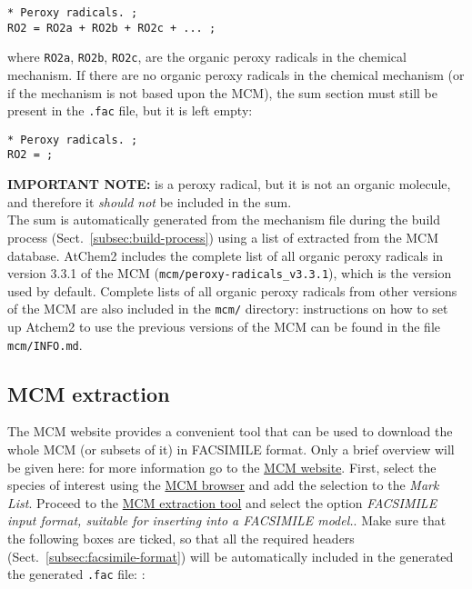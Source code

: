 \begin{verbatim}
* Peroxy radicals. ;
RO2 = RO2a + RO2b + RO2c + ... ;
\end{verbatim}

where \texttt{RO2a}, \texttt{RO2b}, \texttt{RO2c}, are the organic
peroxy radicals in the chemical mechanism. If there are no organic
peroxy radicals in the chemical mechanism (or if the mechanism is not
based upon the MCM), the  sum section must still be present in
the \texttt{.fac} file, but it is left empty:

\begin{verbatim}
* Peroxy radicals. ;
RO2 = ;
\end{verbatim}

\textbf{IMPORTANT NOTE:}  is a peroxy radical, but it is not an
organic molecule, and therefore it \emph{should not} be included in
the  sum.\\

The  sum is automatically generated from the mechanism file
during the build process (Sect.~\ref{subsec:build-process}) using a
list of  extracted from the MCM database. AtChem2 includes the
complete list of all organic peroxy radicals in version 3.3.1 of the
MCM (\texttt{mcm/peroxy-radicals\_v3.3.1}), which is the version used
by default. Complete lists of all organic peroxy radicals from other
versions of the MCM are also included in the \texttt{mcm/} directory:
instructions on how to set up Atchem2 to use the previous versions of
the MCM can be found in the file \texttt{mcm/INFO.md}.

\subsection{MCM extraction} \label{subsec:mcm-extraction}

The MCM website provides a convenient tool that can be used to
download the whole MCM (or subsets of it) in FACSIMILE
format. Only a brief overview will be given here: for more information
go to the \href{http://mcm.leeds.ac.uk/}{MCM website}. First, select the species
of interest using the \href{http://mcm.leeds.ac.uk/MCM/roots.htt}{MCM browser}
and add the selection to the \emph{Mark List}. Proceed to the
\href{http://mcm.leeds.ac.uk/MCM/extract.htt}{MCM extraction tool}
and select the option \emph{FACSIMILE input format, suitable for
  inserting into a FACSIMILE model.}. Make sure that the following
boxes are ticked, so that all the required headers
(Sect.~\ref{subsec:facsimile-format}) will be automatically included
in the generated the generated \texttt{.fac} file: :

